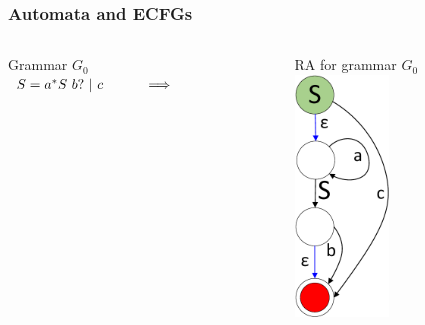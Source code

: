 \documentclass{beamer}
\begin{document}
	\begin{frame} 
		\frametitle{Automata and ECFGs}
		
		\begin{columns}
			\begin{column}{4cm}
				Grammar $G_0$\\
				\vspace{10pt}
				$
				\begin{array}[b]{rl}
				S = a^{*} S\ b? \ | \ c \ \ \ \ \ \ \ \ \  \Longrightarrow
				\end{array}
				$
			\end{column}
			\begin{column}{3.3cm}
				RA for grammar $G_0$\\
				\vspace{10pt}
				\includegraphics[width=2.5cm]{pictures/G0initialAutomaton.pdf}
			\end{column}
		\end{columns}
	\end{frame}
\end{document}
